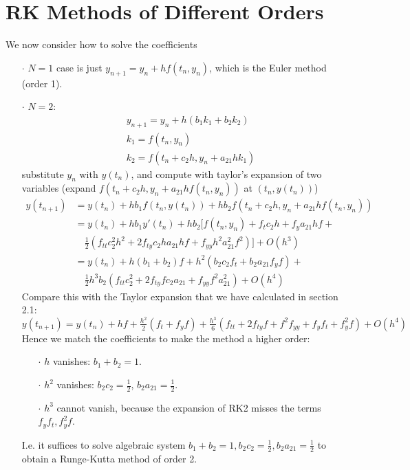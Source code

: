 \documentclass[a4paper, 11pt]{article}
\begin{document}
\section{RK Methods of Different Orders}
We now consider how to solve the coefficients 
\begin{itemize}
	\item[$\cdot$] $N=1$ case is just $y_{n+1} = y_n +hf(t_n, y_n)$, which is the Euler method (order 1).

	\item[$\cdot$] $N=2$:
	\begin{equation}
		\begin{split}
			& y_{n+1} = y_n + h(b_1 k_1 + b_2 k_2) \\
			& k_1 = f(t_n, y_n) \\
			& k_2 = f(t_n + c_2h , y_n+a_{21}hk_1)
		\end{split}
	\end{equation}
	substitute $y_n$ with $y(t_n)$, and compute with taylor's expansion of two variables (expand $f(t_n + c_2h , y_n+a_{21}hf(t_n, y_n))$ at $(t_n, y(t_n))$)
	\begin{equation}
		\begin{split}
			y(t_{n+1}) &= y(t_n) + hb_1 f(t_n,y(t_n)) + hb_2 f(t_n + c_2h , y_n+a_{21}hf(t_n, y_n)) \\
			&= y(t_n) +  hb_1 y'(t_n) + hb_2 [f(t_n, y_n) + f_t c_2h + f_y a_{21} hf + \\
			&\quad \tfrac{1}{2}(f_{tt}c_2^2 h^2 + 2f_{ty}c_2ha_{21}hf + f_{yy}h^2 a_{21}^2 f^2)] + O(h^3) \\
			&= y(t_n) + h(b_1+b_2)f + h^2 (b_2c_2 f_t + b_2 a_{21} f_yf) + \\
			& \quad \tfrac{1}{2}h^3b_2 (f_{tt}c_2^2 + 2f_{ty}f c_2 a_{21} + f_{yy}f^2 a_{21}^2) + O(h^4)
		\end{split}
	\end{equation}
	Compare this with the Taylor expansion that we have calculated in section 2.1: 
	\begin{equation}
		y(t_{n+1}) = y(t_n) + hf + \tfrac{h^2}{2} (f_t + f_yf) + \tfrac{h^3}{6}(f_{tt}+2f_{ty}f+f^2 f_{yy} + f_y f_t + f_y^2 f) + O(h^4)
	\end{equation}
	Hence we match the coefficients to make the method a higher order:
	\begin{itemize}
		\item[$\cdot$] $h$ vanishes: $b_1 + b_2 = 1$.
		\item[$\cdot$] $h^2$ vanishes: $b_2 c_2 = \frac{1}{2}$, $b_{2}a_{21}=\frac{1}{2}$.
		\item[$\cdot$] $h^3$ cannot vanish, because the expansion of RK2 misses the terms $f_yf_t, f_y^2 f$.
	\end{itemize}
	I.e. it suffices to solve algebraic system $b_1 + b_2 = 1, b_2 c_2 = \frac{1}{2}, b_{2}a_{21}=\frac{1}{2}$ to obtain a Runge-Kutta method of order 2.


\end{itemize}
\end{document}
